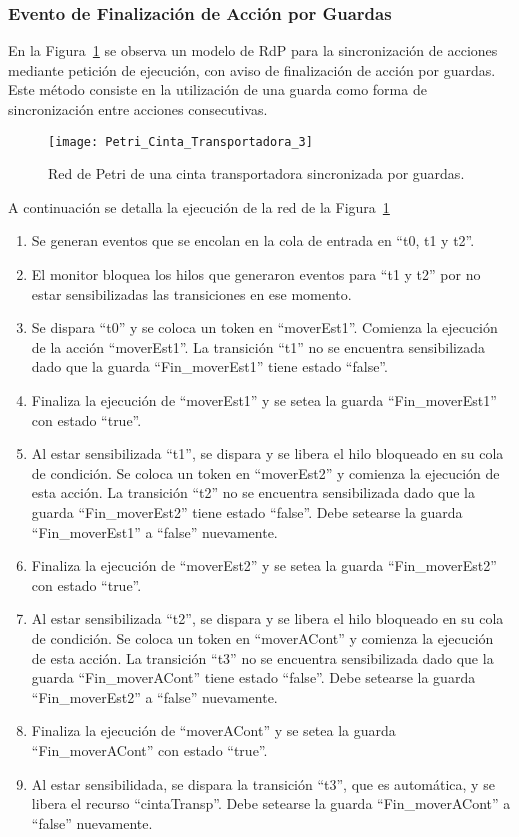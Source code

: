 \subsubsection{Evento de Finalización de Acción por Guardas}
En la Figura~\ref{fig:petri_cinta_transportadora_3} se observa un modelo de
RdP para la sincronización de acciones mediante petición de ejecución, con aviso
de finalización de acción por guardas. Este método consiste en la utilización de
una guarda como forma de sincronización entre acciones consecutivas.

\begin{figure}[H]
    \centering
    \texttt{[image: Petri\_Cinta\_Transportadora\_3]}
    \caption{Red de Petri de una cinta transportadora sincronizada por guardas.}
    \label{fig:petri_cinta_transportadora_3}
\end{figure}

A continuación se detalla la ejecución de la red de la
Figura~\ref{fig:petri_cinta_transportadora_3}
\begin{enumerate}
    \item Se generan eventos que se encolan en la cola de entrada en “t0, t1 y
    t2”.
	\item El monitor bloquea los hilos que generaron eventos para “t1 y t2” por
	no estar sensibilizadas las transiciones en ese momento.
	\item Se dispara ``t0'' y se coloca un token en ``moverEst1''. Comienza la
	ejecución de la acción ``moverEst1''. La transición ``t1'' no se encuentra
	sensibilizada dado que la guarda ``Fin\_moverEst1'' tiene estado ``false''.
	\item Finaliza la ejecución de ``moverEst1'' y se setea la guarda
	``Fin\_moverEst1'' con estado ``true''.
	\item Al estar sensibilizada ``t1'', se dispara y se libera el hilo
	bloqueado en su cola de condición. Se coloca un token en ``moverEst2'' y
	comienza la ejecución de esta acción. La transición ``t2'' no se encuentra
	sensibilizada dado que la guarda ``Fin\_moverEst2'' tiene estado ``false''.
	Debe setearse la guarda ``Fin\_moverEst1'' a ``false'' nuevamente.
	\item Finaliza la ejecución de ``moverEst2'' y se setea la guarda
	``Fin\_moverEst2'' con estado ``true''.
	\item Al estar sensibilizada ``t2'', se dispara y se libera el hilo
	bloqueado en su cola de condición. Se coloca un token en ``moverACont'' y
	comienza la ejecución de esta acción. La transición ``t3'' no se encuentra
	sensibilizada dado que la guarda ``Fin\_moverACont'' tiene estado ``false''.
	Debe setearse la guarda ``Fin\_moverEst2'' a ``false'' nuevamente.
	\item Finaliza la ejecución de ``moverACont'' y se setea la guarda
	``Fin\_moverACont'' con estado ``true''.
	\item Al estar sensibilidada, se dispara la transición ``t3'', que es
	automática, y se libera el recurso ``cintaTransp''. Debe setearse la guarda
	``Fin\_moverACont'' a ``false'' nuevamente.
\end{enumerate}

